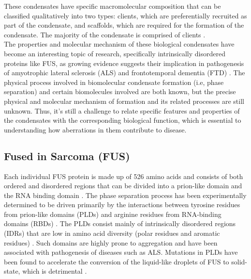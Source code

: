 \documentclass[12ptr]{article}
\begin{document}
These condensates have specific macromolecular composition that can be classified qualitatively into two types: clients, which are preferentially recruited as part of the condensate, and scaffolds, which are required for the formation of the condensate. The majority of the condensate is comprised of clients \cite{Banani_17}.\\[0.01cm]

The properties and molecular mechanism of these biological condensates have become an interesting topic of research, specifically intrinsically disordered proteins like FUS, as growing evidence suggests their implication in pathogenesis of amyotrophic lateral sclerosis (ALS) and frontotemporal dementia (FTD) \cite{Deng_14}. The physical process involved in biomolecular condensate formation (i.e, phase separation) and certain biomolecules involved are both known, but the precise physical and molecular mechanism of formation and its related processes are still unknown. Thus, it’s still a challenge to relate specific features and properties of the condensates with the corresponding biological function, which is essential to understanding how aberrations in them contribute to disease. \\[0.01cm]

\subsection{Fused in Sarcoma (FUS)}

Each individual FUS protein is made up of 526 amino acids and consists of both ordered and disordered regions that can be divided into a prion-like domain and the RNA binding domain \cite{Murray_17}. The phase separation process has been experimentally determined to be driven primarily by the interactions between tyrosine residues from prion-like domains (PLDs) and arginine residues from RNA-binding domains (RBDs) \cite{Wang_18}. The PLDs consist mainly of intrinsically disordered regions (IDRs) that are low in amino acid diversity (polar residues and aromatic residues) \cite{Wang_18}. Such domains are highly prone to aggregation and have been associated with pathogenesis of diseases such as ALS. Mutations in PLDs have been found to accelerate the conversion of the liquid-like droplets of FUS to solid-state, which is detrimental \cite{Patel_15}.

\newpage
\end{document}
